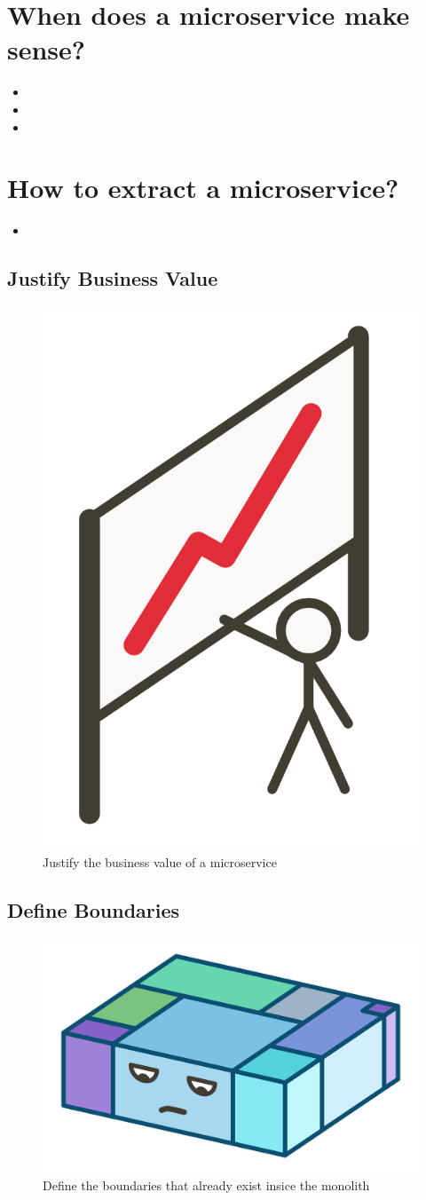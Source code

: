 \section{When does a microservice make sense?}

\begin{itemize}
  \item {}
  \item {}
  \item {}
\end{itemize}


\section{How to extract a microservice?}

\begin{itemize}
  \item {}
\end{itemize}

\subsection{Justify Business Value}

\begin{figure}[ht]
  \centering
  \includegraphics[width=0.3\linewidth]{assets/illustration-business-values.png}
  \caption{Justify the business value of a microservice}
\end{figure}

\subsection{Define Boundaries}

\begin{figure}[ht]
  \centering
  \includegraphics[width=0.4\linewidth]{assets/illustration-monolith-boundaries.png}
  \caption{Define the boundaries that already exist insice the monolith}
\end{figure}

